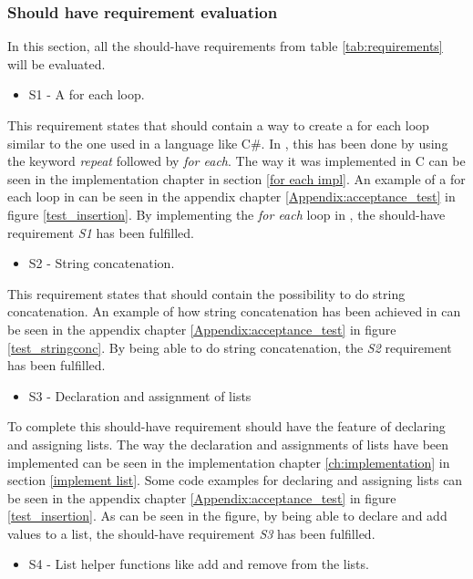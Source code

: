 \subsubsection{Should have requirement evaluation}
In this section, all the should-have requirements from table \ref{tab:requirements} will be evaluated.
\begin{itemize}
    \item S1 - A for each loop.
\end{itemize}
This requirement states that \lang should contain a way to create a for each loop similar to the one used in a language like C\#. In \lang, this has been done by using the keyword \textit{repeat} followed by \textit{for each}. The way it was implemented in C can be seen in the implementation chapter in section \ref{for each impl}. An example of a for each loop in \lang can be seen in the appendix chapter \ref{Appendix:acceptance_test} in figure \ref{test_insertion}. By implementing the \textit{for each} loop in \lang, the should-have requirement \textit{S1} has been fulfilled.
\\
\begin{itemize}
    \item S2 - String concatenation.
\end{itemize}
This requirement states that \lang should contain the possibility to do string concatenation. An example of how string concatenation has been achieved in \lang can be seen in the appendix chapter \ref{Appendix:acceptance_test} in figure \ref{test_stringconc}. By being able to do string concatenation, the \textit{S2} requirement has been fulfilled.
\\
\begin{itemize}
    \item S3 - Declaration and assignment of lists
\end{itemize}
To complete this should-have requirement \lang should have the feature of declaring and assigning lists. The way the declaration and assignments of lists have been implemented can be seen in the implementation chapter \ref{ch:implementation} in section \ref{implement list}. Some code examples for declaring and assigning lists can be seen in the appendix chapter \ref{Appendix:acceptance_test} in figure \ref{test_insertion}. As can be seen in the figure, by being able to declare and add values to a list, the should-have requirement \textit{S3} has been fulfilled.
\\
\begin{itemize}
    \item S4 - List helper functions like add and remove from the lists.
\end{itemize}
